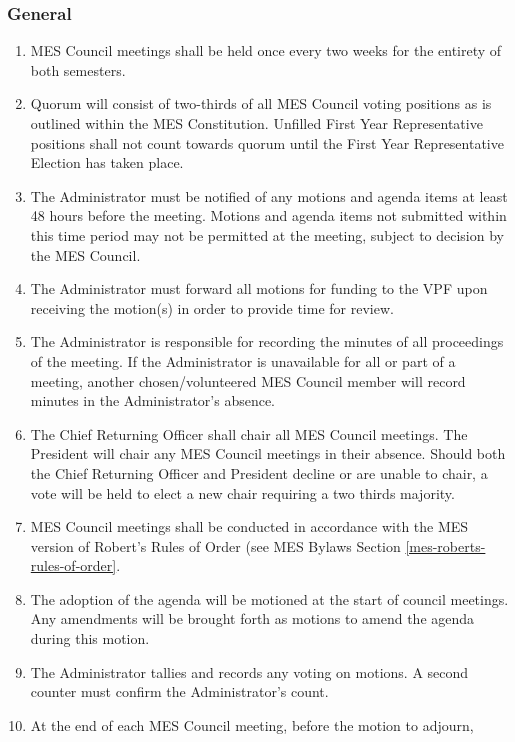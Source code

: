 \subsubsection{General}
\label{meetings-general}

\begin{enumerate}
 \item
  MES Council meetings shall be held once every two weeks for the
  entirety of both semesters.
 \item
  Quorum will consist of two-thirds of all MES Council voting positions
  as is outlined within the MES Constitution. Unfilled First Year
  Representative positions shall not count towards quorum until the
  First Year Representative Election has taken place.
 \item
  The Administrator must be notified of any motions and agenda items at
  least 48 hours before the meeting. Motions and agenda items not
  submitted within this time period may not be permitted at the meeting,
  subject to decision by the MES Council.
 \item
  The Administrator must forward all motions for funding to the VPF upon
  receiving the motion(s) in order to provide time for review.
 \item
  The Administrator is responsible for recording the minutes of all
  proceedings of the meeting. If the Administrator is unavailable for
  all or part of a meeting, another chosen/volunteered MES Council
  member will record minutes in the Administrator's absence.
 \item \label{CRO-chair-meetings}
  The Chief Returning Officer shall chair all MES Council meetings. The
  President will chair any MES Council meetings in their absence. Should
  both the Chief Returning Officer and President decline or are unable
  to chair, a vote will be held to elect a new chair requiring a two
  thirds majority.
 \item
  MES Council meetings shall be conducted in accordance with the MES
  version of Robert's Rules of Order (see MES Bylaws Section
  \ref{mes-roberts-rules-of-order}.
 \item
  The adoption of the agenda will be motioned at the start of council
  meetings. Any amendments will be brought forth as motions to amend the
  agenda during this motion.
 \item
  The Administrator tallies and records any voting on motions. A second
  counter must confirm the Administrator's count.
 \item
  At the end of each MES Council meeting, before the motion to adjourn,

\end{enumerate}
